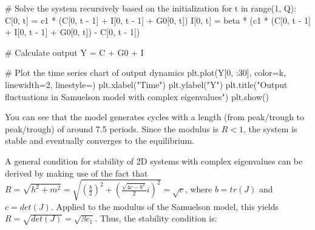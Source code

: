 \documentclass[
  letterpaper,
  DIV=11,
  numbers=noendperiod]{scrreprt}
\newenvironment{Shaded}{\begin{snugshade}}{\end{snugshade}}
\newcommand{\BuiltInTok}[1]{\textcolor[rgb]{0.00,0.23,0.31}{#1}}
\newcommand{\CommentTok}[1]{\textcolor[rgb]{0.37,0.37,0.37}{#1}}
\newcommand{\ControlFlowTok}[1]{\textcolor[rgb]{0.00,0.23,0.31}{#1}}
\newcommand{\DecValTok}[1]{\textcolor[rgb]{0.68,0.00,0.00}{#1}}
\newcommand{\KeywordTok}[1]{\textcolor[rgb]{0.00,0.23,0.31}{#1}}
\newcommand{\NormalTok}[1]{\textcolor[rgb]{0.00,0.23,0.31}{#1}}
\newcommand{\OperatorTok}[1]{\textcolor[rgb]{0.37,0.37,0.37}{#1}}
\newcommand{\StringTok}[1]{\textcolor[rgb]{0.13,0.47,0.30}{#1}}
\begin{document}
\begin{tcolorbox}
\begin{Shaded}
\begin{Highlighting}[]
\CommentTok{\# Solve the system recursively based on the initialization}
\ControlFlowTok{for}\NormalTok{ t }\KeywordTok{in} \BuiltInTok{range}\NormalTok{(}\DecValTok{1}\NormalTok{, Q):}
\NormalTok{    C[}\DecValTok{0}\NormalTok{, t] }\OperatorTok{=}\NormalTok{ c1 }\OperatorTok{*}\NormalTok{ (C[}\DecValTok{0}\NormalTok{, t }\OperatorTok{{-}} \DecValTok{1}\NormalTok{] }\OperatorTok{+}\NormalTok{ I[}\DecValTok{0}\NormalTok{, t }\OperatorTok{{-}} \DecValTok{1}\NormalTok{] }\OperatorTok{+}\NormalTok{ G0[}\DecValTok{0}\NormalTok{, t])}
\NormalTok{    I[}\DecValTok{0}\NormalTok{, t] }\OperatorTok{=}\NormalTok{ beta }\OperatorTok{*}\NormalTok{ (c1 }\OperatorTok{*}\NormalTok{ (C[}\DecValTok{0}\NormalTok{, t }\OperatorTok{{-}} \DecValTok{1}\NormalTok{] }\OperatorTok{+}\NormalTok{ I[}\DecValTok{0}\NormalTok{, t }\OperatorTok{{-}} \DecValTok{1}\NormalTok{] }\OperatorTok{+}\NormalTok{ G0[}\DecValTok{0}\NormalTok{, t]) }\OperatorTok{{-}}\NormalTok{ C[}\DecValTok{0}\NormalTok{, t }\OperatorTok{{-}} \DecValTok{1}\NormalTok{])}

\CommentTok{\# Calculate output}
\NormalTok{Y }\OperatorTok{=}\NormalTok{ C }\OperatorTok{+}\NormalTok{ G0 }\OperatorTok{+}\NormalTok{ I}

\CommentTok{\# Plot the time series chart of output dynamics}
\NormalTok{plt.plot(Y[}\DecValTok{0}\NormalTok{, :}\DecValTok{30}\NormalTok{], color}\OperatorTok{=}\StringTok{\textquotesingle{}k\textquotesingle{}}\NormalTok{, linewidth}\OperatorTok{=}\DecValTok{2}\NormalTok{, linestyle}\OperatorTok{=}\StringTok{\textquotesingle{}{-}\textquotesingle{}}\NormalTok{)}
\NormalTok{plt.xlabel(}\StringTok{"Time"}\NormalTok{)}
\NormalTok{plt.ylabel(}\StringTok{"Y"}\NormalTok{)}
\NormalTok{plt.title(}\StringTok{"Output fluctuations in Samuelson model with complex eigenvalues"}\NormalTok{)}
\NormalTok{plt.show()}
\end{Highlighting}
\end{Shaded}

\end{tcolorbox}

You can see that the model generates cycles with a length (from
peak/trough to peak/trough) of around 7.5 periods. Since the modulus is
\(R<1\), the system is stable and eventually converges to the
equilibrium.

A general condition for stability of 2D systems with complex eigenvalues
can be derived by making use of the fact that
\(R=\sqrt{h^2+m^2}= \sqrt{ \left( \frac{b}{2} \right) ^2 + \left(\frac{\sqrt{4c-b^2}}{2}i \right)^2} = \sqrt{c}\),
where \(b=tr(J)\) and \(c=det(J)\). Applied to the modulus of the
Samuelson model, this yields \(R=\sqrt{det(J)}=\sqrt{\beta c_1}\). Thus,
the stability condition is:
\end{document}
